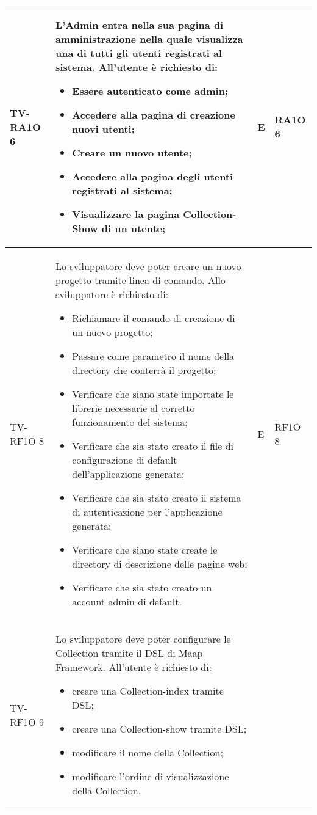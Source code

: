 \begin{center}
\begin{longtable}{| p{3cm} | p{6cm} | p{1.5cm} | p{2cm} | }
				TV-RA1O 6 & 
				L'Admin entra nella sua pagina di amministrazione nella quale visualizza una \glossario{Collection-Index} di tutti gli utenti registrati al sistema.
All'utente è richiesto di:
\begin{itemize}
\item Essere autenticato come admin;
\item Accedere alla pagina di creazione nuovi utenti;
\item Creare un nuovo utente;
\item Accedere alla pagina degli utenti registrati al sistema;
\item Visualizzare la pagina Collection-Show di un utente;
\end{itemize}
 & E & RA1O 6 \newline  \\ \hline 
				TV-RF1O 8 & 
				Lo sviluppatore deve poter creare un nuovo progetto tramite linea di comando.
\newline
Allo sviluppatore è richiesto di:
\begin{itemize}
\item Richiamare il comando di creazione di un nuovo progetto;
\item Passare come parametro il nome della directory che conterrà il progetto;
\item Verificare che siano state importate le librerie necessarie al corretto funzionamento del sistema;
\item Verificare che sia stato creato il file di configurazione di default dell’applicazione generata;
\item Verificare che sia stato creato il sistema di autenticazione per l’applicazione generata;
\item Verificare che siano state create le directory di descrizione delle pagine web;
\item Verificare che sia stato creato un account admin di default.
\end{itemize} & E & RF1O 8 \newline  \\ \hline 
				TV-RF1O 9 & 
				Lo sviluppatore deve poter configurare le Collection tramite il DSL di Maap Framework.
All'utente è richiesto di:
\begin{itemize}
\item creare una Collection-index tramite DSL;
\item creare una Collection-show tramite DSL;
\item modificare il nome della Collection;
\item modificare l'ordine di visualizzazione della Collection.

\end{itemize}
\end{longtable}
\end{center}
